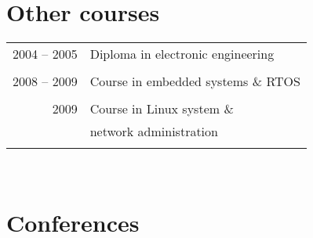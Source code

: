 \documentclass[10pt]{article} %
\begin{document}
{\begin{minipage}[t]{0.44\textwidth}
\begin{tabular}{rl}

\end{tabular}\\[10pt]


\section{Other courses} 

\begin{tabular}{rl} %


2004 -- 2005 & \normalsize{Diploma in electronic engineering} \\ 
&\\
	 

2008 -- 2009 & \normalsize{Course in embedded systems \& RTOS} \\
&\\
	 

2009 & \normalsize{Course in Linux system \&} \\
     & \normalsize{network administration} \\	
&\\


\end{tabular}\\[10pt]






\section{Conferences} 


\end{minipage}}
\end{document}
